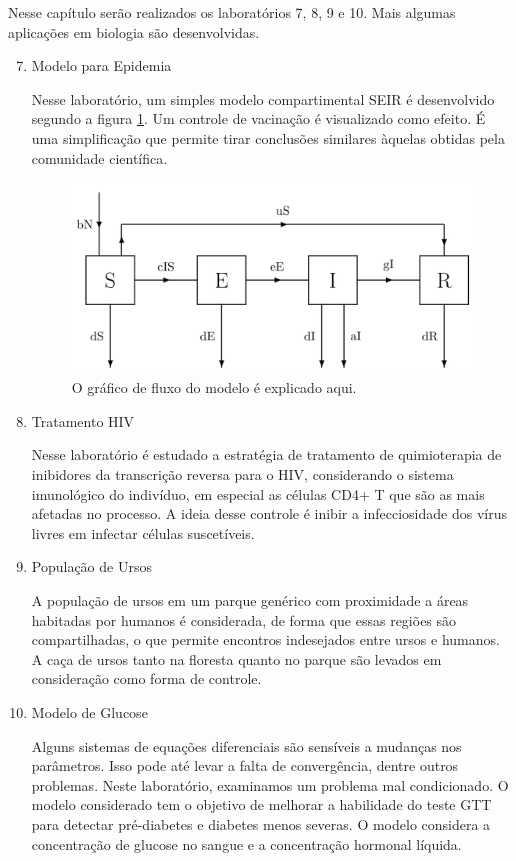 Nesse capítulo serão realizados os laboratórios 7, 8, 9 e 10. Mais algumas
aplicações em biologia são desenvolvidas.

\begin{enumerate}[label=\textbf{Lab \arabic*:}]
    \setcounter{enumi}{6}

    \item Modelo para Epidemia 
    
    Nesse laboratório, um simples modelo compartimental SEIR é desenvolvido
    segundo a figura \ref{fig1:seir}. Um controle de vacinação é visualizado
    como  efeito. É uma simplificação que permite tirar conclusões similares
    àquelas obtidas pela comunidade científica. 

    \begin{figure}[hb]
        \center
        \includegraphics[width = \textwidth]{../images/flow-chat-seir.png}
        \caption{O gráfico de fluxo do modelo é explicado aqui.}
        \label{fig1:seir}
    \end{figure}

    \item Tratamento HIV
    
    Nesse laboratório é estudado a estratégia de tratamento de quimioterapia
    de inibidores da transcrição reversa para o HIV, considerando o sistema
    imunológico do indivíduo, em especial as células CD4+ T que são as mais
    afetadas no processo. A ideia desse controle é inibir a infecciosidade dos
    vírus livres em infectar células suscetíveis. 
    
    \item População de Ursos

    A população de ursos em um parque genérico com proximidade a áreas
    habitadas por humanos é considerada, de forma que essas regiões são
    compartilhadas, o que permite encontros indesejados entre ursos e humanos.
    A caça de ursos tanto na floresta quanto no parque são levados em
    consideração como forma de controle. 

    \item Modelo de Glucose 
    
    Alguns sistemas de equações diferenciais são sensíveis a mudanças nos
    parâmetros. Isso pode até levar a falta de convergência, dentre outros
    problemas. Neste laboratório, examinamos um problema mal condicionado. O
    modelo considerado tem o objetivo de melhorar a habilidade do teste GTT
    para detectar pré-diabetes e diabetes menos severas. O modelo considera a
    concentração de glucose no sangue e a concentração hormonal líquida. 
 
\end{enumerate}